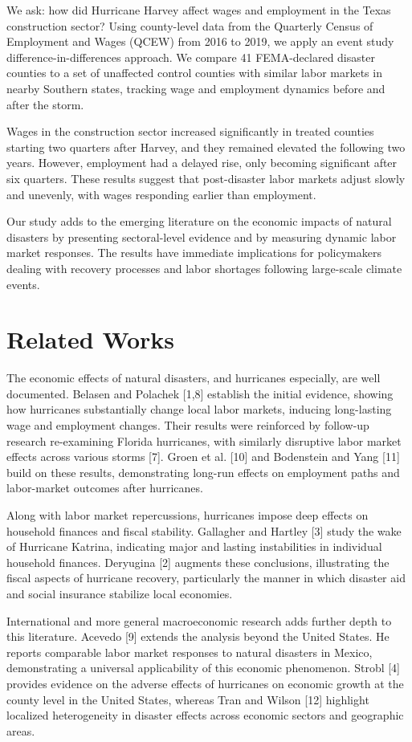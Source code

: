 \documentclass{article}
\begin{document}
We ask: how did Hurricane Harvey affect wages and employment in the Texas construction sector? Using county-level data from the Quarterly Census of Employment and Wages (QCEW) from 2016 to 2019, we apply an event study difference-in-differences approach. We compare 41 FEMA-declared disaster counties to a set of unaffected control counties with similar labor markets in nearby Southern states, tracking wage and employment dynamics before and after the storm.

Wages in the construction sector increased significantly in treated counties starting two quarters after Harvey, and they remained elevated the following two years. However, employment had a delayed rise, only becoming significant after six quarters. These results suggest that post-disaster labor markets adjust slowly and unevenly, with wages responding earlier than employment.

Our study adds to the emerging literature on the economic impacts of natural disasters by presenting sectoral-level evidence and by measuring dynamic labor market responses. The results have immediate implications for policymakers dealing with recovery processes and labor shortages following large-scale climate events.

\section{Related Works}
The economic effects of natural disasters, and hurricanes especially, are well documented. Belasen and Polachek [1,8] establish the initial evidence, showing how hurricanes substantially change local labor markets, inducing long-lasting wage and employment changes. Their results were reinforced by follow-up research re-examining Florida hurricanes, with similarly disruptive labor market effects across various storms [7]. Groen et al. [10] and Bodenstein and Yang [11] build on these results, demonstrating long-run effects on employment paths and labor-market outcomes after hurricanes.

Along with labor market repercussions, hurricanes impose deep effects on household finances and fiscal stability. Gallagher and Hartley [3] study the wake of Hurricane Katrina, indicating major and lasting instabilities in individual household finances. Deryugina [2] augments these conclusions, illustrating the fiscal aspects of hurricane recovery, particularly the manner in which disaster aid and social insurance stabilize local economies.

International and more general macroeconomic research adds further depth to this literature. Acevedo [9] extends the analysis beyond the United States. He reports comparable labor market responses to natural disasters in Mexico, demonstrating a universal applicability of this economic phenomenon. Strobl [4] provides evidence on the adverse effects of hurricanes on economic growth at the county level in the United States, whereas Tran and Wilson [12] highlight localized heterogeneity in disaster effects across economic sectors and geographic areas.
\end{document}
